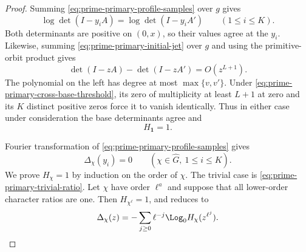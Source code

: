 \begin{proof}
Summing \eqref{eq:prime-primary-profile-samples} over \(g\) gives
\[
 \log\det(I-y_iA)=\log\det(I-y_iA')
 \qquad(1\le i\le K).
\]
Both determinants are positive on \((0,x)\), so their values agree at the
\(y_i\).  Likewise, summing \eqref{eq:prime-primary-initial-jet} over \(g\)
and using the primitive-orbit product gives
\[
 \det(I-zA)-\det(I-zA')=O(z^{L+1}).
\]
The polynomial on the left has degree at most \(\max\{v,v'\}\).  Under
\eqref{eq:prime-primary-cross-base-threshold}, its zero of multiplicity at
least \(L+1\) at zero and its \(K\) distinct positive zeros force it to
vanish identically.  Thus in either case under consideration the base
determinants agree and
\begin{equation}\label{eq:prime-primary-trivial-ratio}
 H_{\mathbf1}=1.
\end{equation}

Fourier transformation of \eqref{eq:prime-primary-profile-samples} gives
\begin{equation}\label{eq:prime-primary-fourier-samples}
 \Delta_\chi(y_i)=0
 \qquad(\chi\in\widehat G,\ 1\le i\le K).
\end{equation}
We prove \(H_\chi=1\) by induction on the order of \(\chi\).  The trivial
case is \eqref{eq:prime-primary-trivial-ratio}.  Let \(\chi\) have order
\(\ell^a\) and suppose that all lower-order character ratios are one.  Then
\(H_{\chi^\ell}=1\), and
 reduces to
\begin{equation}\label{eq:prime-primary-one-orbit}
 \Delta_\chi(z)
 =-\sum_{j\ge0}\ell^{-j}\Log_0H_\chi(z^{\ell^j}).
\end{equation}


\end{proof}
